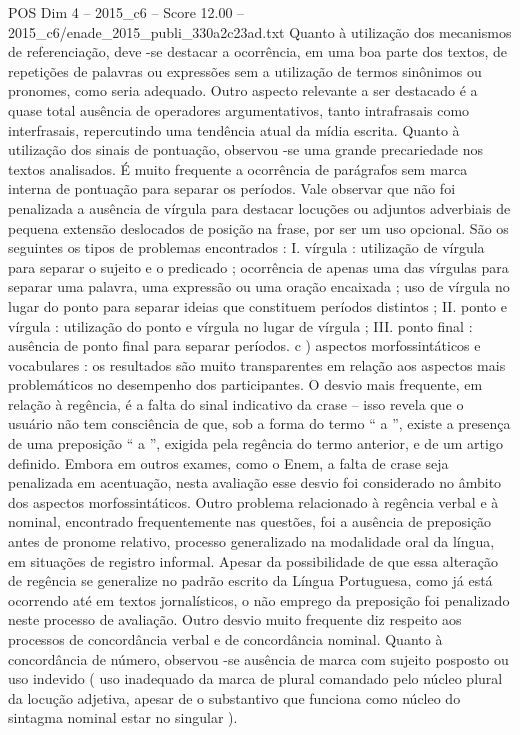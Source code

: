 \begin{textsample}{POS Dim 4 – 2015\_c6 – Score 12.00 – 2015\_c6/enade\_2015\_publi\_330a2c23ad.txt}
Quanto à utilização dos mecanismos de referenciação, deve -se destacar a ocorrência, em uma boa parte dos textos, de repetições de palavras ou expressões sem a utilização de termos sinônimos ou pronomes, como seria adequado.
Outro aspecto relevante a ser destacado é a quase total ausência de operadores argumentativos, tanto intrafrasais como interfrasais, repercutindo uma tendência atual da mídia escrita.
Quanto à utilização dos sinais de pontuação, observou -se uma grande precariedade nos textos analisados.
É muito frequente a ocorrência de parágrafos sem marca interna de pontuação para separar os períodos.
Vale observar que não foi penalizada a ausência de vírgula para destacar locuções ou adjuntos adverbiais de pequena extensão deslocados de posição na frase, por ser um uso opcional.
São os seguintes os tipos de problemas encontrados : I. vírgula : utilização de vírgula para separar o sujeito e o predicado ; ocorrência de apenas uma das vírgulas para separar uma palavra, uma expressão ou uma oração encaixada ; uso de vírgula no lugar do ponto para separar ideias que constituem períodos distintos ; II. ponto e vírgula : utilização do ponto e vírgula no lugar de vírgula ; III. ponto final : ausência de ponto final para separar períodos. c ) aspectos morfossintáticos e vocabulares : os resultados são muito transparentes em relação aos aspectos mais problemáticos no desempenho dos participantes.
O desvio mais frequente, em relação à regência, é a falta do sinal indicativo da crase – isso revela que o usuário não tem consciência de que, sob a forma do termo “ a ”, existe a presença de uma preposição “ a ”, exigida pela regência do termo anterior, e de um artigo definido.
Embora em outros exames, como o Enem, a falta de crase seja penalizada em acentuação, nesta avaliação esse desvio foi considerado no âmbito dos aspectos morfossintáticos.
Outro problema relacionado à regência verbal e à nominal, encontrado frequentemente nas questões, foi a ausência de preposição antes de pronome relativo, processo generalizado na modalidade oral da língua, em situações de registro informal.
Apesar da possibilidade de que essa alteração de regência se generalize no padrão escrito da Língua Portuguesa, como já está ocorrendo até em textos jornalísticos, o não emprego da preposição foi penalizado neste processo de avaliação.
Outro desvio muito frequente diz respeito aos processos de concordância verbal e de concordância nominal.
Quanto à concordância de número, observou -se ausência de marca com sujeito posposto ou uso indevido ( uso inadequado da marca de plural comandado pelo núcleo plural da locução adjetiva, apesar de o substantivo que funciona como núcleo do sintagma nominal estar no singular ).

\end{textsample}
